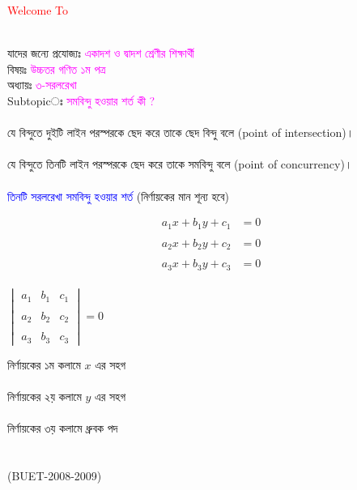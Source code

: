 \documentclass{article}
\begin{document}
 
	\Large
	\textcolor{red}{Welcome To} 
	\\
	\\
	যাদের জন্যে প্রযোজ্যঃ  	\textcolor{magenta}{একাদশ ও দ্বাদশ শ্রেণীর শিক্ষার্থী} \\
	বিষয়ঃ \textcolor{magenta}{উচ্চতর গণিত ১ম পত্র} \\
	অধ্যায়ঃ \textcolor{magenta}{৩-সরলরেখা}\\ 
	Subtopicঃ  \textcolor{magenta}{  সমবিন্দু হওয়ার শর্ত কী ?  }\\
	\\
	যে বিন্দুতে দুইটি লাইন পরস্পরকে ছেদ করে তাকে ছেদ বিন্দু বলে (point of intersection)।  \\ 
	\\
	যে বিন্দুতে তিনটি লাইন পরস্পরকে ছেদ করে তাকে সমবিন্দু বলে (point of concurrency)। \\
	\\
	\textcolor{blue}{ তিনটি সরলরেখা সমবিন্দু হওয়ার শর্ত }(নির্ণায়কের মান শূন্য হবে)\\
	\begin{multicols}{2}
		\begin{align*}
			a_1x+b_1y+c_1&=0\\
			\\
			a_2x+b_2y+c_2&=0\\
			\\
			a_3x+b_3y+c_3&=0
		\end{align*}
		\\ 
		$	\begin{vmatrix}
			a_1 & b_1 &c_1\\
			\\
			a_2 & b_2 &c_2\\
			\\
			a_3 & b_3 &c_3
		\end{vmatrix}=0$\\ 
	\end{multicols}
	নির্ণায়কের ১ম কলামে $x$ এর সহগ \\
	\\
	নির্ণায়কের ২য় কলামে $y$ এর সহগ \\
	\\
	নির্ণায়কের ৩য় কলামে ধ্রুবক পদ \\
	\\
	\vspace{3cm}
	\\
	(BUET-2008-2009)\\
\end{document}
